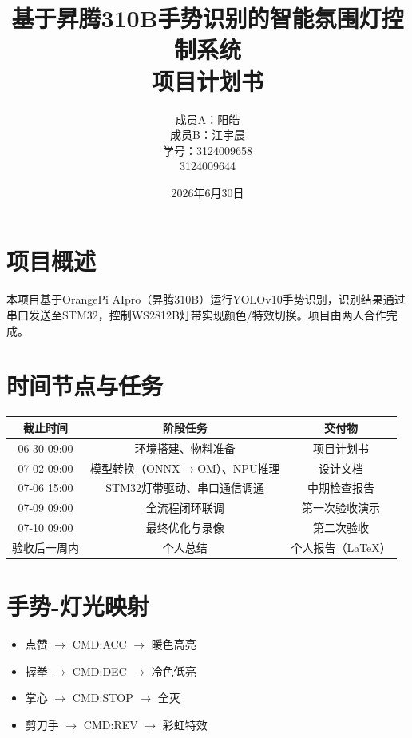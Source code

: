 \documentclass[a4paper,12pt]{article}
\title{\textbf{基于昇腾310B手势识别的智能氛围灯控制系统}\\ 项目计划书}
\author{成员A：阳皓 \\ 成员B：江宇晨\\ 学号：3124009658\\3124009644}
\date{2026年6月30日}
\begin{document}
\maketitle
\thispagestyle{empty}
\newpage

\section{项目概述}
本项目基于OrangePi AIpro（昇腾310B）运行YOLOv10手势识别，识别结果通过串口发送至STM32，控制WS2812B灯带实现颜色/特效切换。项目由两人合作完成。

\section{时间节点与任务}
\begin{table}[H]
\centering
\begin{tabular}{@{}ccc@{}}
\toprule
\textbf{截止时间} & \textbf{阶段任务} & \textbf{交付物} \\
\midrule
06-30 09:00 & 环境搭建、物料准备 & 项目计划书 \\
07-02 09:00 & 模型转换（ONNX$\to$OM）、NPU推理 & 设计文档 \\
07-06 15:00 & STM32灯带驱动、串口通信调通 & 中期检查报告 \\
07-09 09:00 & 全流程闭环联调 & 第一次验收演示 \\
07-10 09:00 & 最终优化与录像 & 第二次验收 \\
验收后一周内 & 个人总结 & 个人报告（LaTeX） \\
\bottomrule
\end{tabular}
\end{table}

\section{手势-灯光映射}
\begin{itemize}
    \item 点赞 $\to$ CMD:ACC $\to$ 暖色高亮
    \item 握拳 $\to$ CMD:DEC $\to$ 冷色低亮
    \item 掌心 $\to$ CMD:STOP $\to$ 全灭
    \item 剪刀手 $\to$ CMD:REV $\to$ 彩虹特效
\end{itemize}
\end{document}
